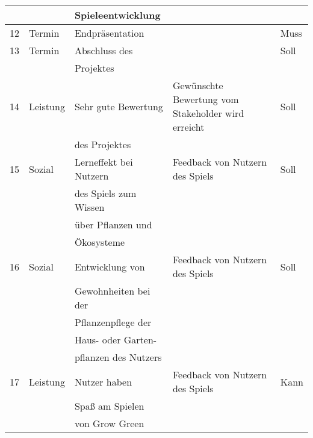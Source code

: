 \begin{table}[H]
\begin{tabular}{|c|l|l|l|l|}
        && Spieleentwicklung &&\\
        \hline
        12 & Termin & Endpräsentation && Muss\\ 
        \hline
        13 & Termin & Abschluss des && Soll\\  
        && Projektes &&\\
        \hline
        14 & Leistung & Sehr gute Bewertung & Gewünschte Bewertung vom Stakeholder wird erreicht & Soll\\ 
        &&  des Projektes &&\\
        \hline
        15 & Sozial & Lerneffekt bei Nutzern& Feedback von Nutzern des Spiels & Soll\\ 
        && des Spiels zum Wissen &&\\
        && über Pflanzen und &&\\
        && Ökosysteme &&\\
        \hline
        16 & Sozial & Entwicklung von  & Feedback von Nutzern des Spiels & Soll\\ 
        && Gewohnheiten bei der &&\\
        && Pflanzenpflege der &&\\
        && Haus- oder Garten-&&\\
        && pflanzen des Nutzers &&\\
        \hline
        17 & Leistung & Nutzer haben & Feedback von Nutzern des Spiels & Kann\\ 
        && Spaß am Spielen &&\\
        && von Grow Green &&\\ 
        \hline
    \end{tabular}\label{tab:projektziele}
\end{table}